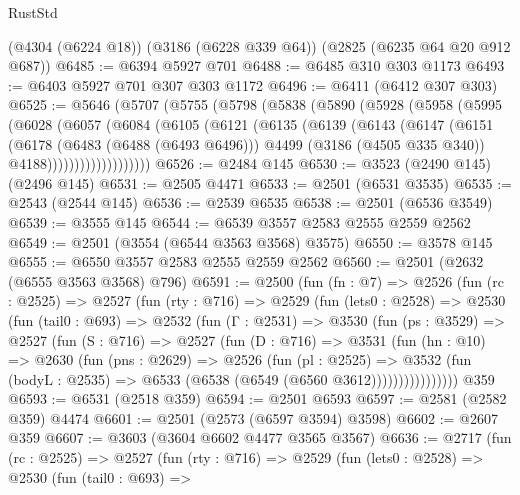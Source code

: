 \begin{lexlean}{RustStd}
\begin{coremodule}
    (@4304 (@6224 @18))
    (@3186 (@6228 @339 @64))
    (@2825 (@6235 @64 @20 @912 @687))
@6485 := @6394 @5927 @701
@6488 := @6485 @310 @303 @1173
@6493 := @6403 @5927 @701 @307 @303 @1172
@6496 := @6411 (@6412 @307 @303)
@6525 := @5646
    (@5707
      (@5755
        (@5798
          (@5838
            (@5890
              (@5928
                (@5958
                  (@5995
                    (@6028
                      (@6057
                        (@6084
                          (@6105
                            (@6121
                              (@6135
                                (@6139
                                  (@6143
                                    (@6147
                                      (@6151
                                        (@6178
                                          (@6483 (@6488 (@6493 @6496)))
                                          @4499
                                          (@3186 (@4505 @335 @340))
                                          @4188)))))))))))))))))))
@6526 := @2484 @145
@6530 := @3523 (@2490 @145) (@2496 @145)
@6531 := @2505 @4471
@6533 := @2501 (@6531 @3535)
@6535 := @2543 (@2544 @145)
@6536 := @2539 @6535
@6538 := @2501 (@6536 @3549)
@6539 := @3555 @145
@6544 := @6539 @3557 @2583 @2555 @2559 @2562
@6549 := @2501 (@3554 (@6544 @3563 @3568) @3575)
@6550 := @3578 @145
@6555 := @6550 @3557 @2583 @2555 @2559 @2562
@6560 := @2501 (@2632 (@6555 @3563 @3568) @796)
@6591 := @2500
    (fun (fn : @7) =>
    @2526
      (fun (rc : @2525) =>
      @2527
        (fun (rty : @716) =>
        @2529
          (fun (lets0 : @2528) =>
          @2530
            (fun (tail0 : @693) =>
            @2532
              (fun (Γ : @2531) =>
              @3530
                (fun (ps : @3529) =>
                @2527
                  (fun (S : @716) =>
                  @2527
                    (fun (D : @716) =>
                    @3531
                      (fun (hn : @10) =>
                      @2630
                        (fun (pns : @2629) =>
                        @2526
                          (fun (pl : @2525) =>
                          @3532
                            (fun (bodyL : @2535) => @6533 (@6538 (@6549 (@6560 @3612))))))))))))))))
    @359
@6593 := @6531 (@2518 @359)
@6594 := @2501 @6593
@6597 := @2581 (@2582 @359) @4474
@6601 := @2501 (@2573 (@6597 @3594) @3598)
@6602 := @2607 @359
@6607 := @3603 (@3604 @6602 @4477 @3565 @3567)
@6636 := @2717
    (fun (rc : @2525) =>
    @2527
      (fun (rty : @716) =>
      @2529
        (fun (lets0 : @2528) =>
        @2530
          (fun (tail0 : @693) =>

\end{coremodule}
\end{lexlean}
